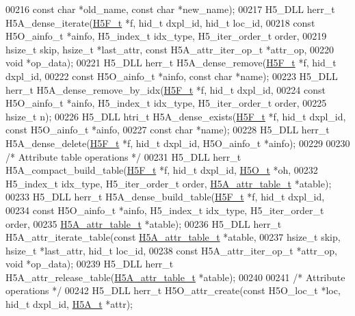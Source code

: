 \begin{DoxyCode}
00216     \textcolor{keyword}{const} \textcolor{keywordtype}{char} *old\_name, \textcolor{keyword}{const} \textcolor{keywordtype}{char} *new\_name);
00217 H5\_DLL herr\_t H5A\_dense\_iterate(\hyperlink{struct_h5_f__t}{H5F\_t} *f, hid\_t dxpl\_id, hid\_t loc\_id,
00218     \textcolor{keyword}{const} H5O\_ainfo\_t *ainfo, H5\_index\_t idx\_type, H5\_iter\_order\_t order,
00219     hsize\_t skip, hsize\_t *last\_attr, \textcolor{keyword}{const} H5A\_attr\_iter\_op\_t *attr\_op,
00220     \textcolor{keywordtype}{void} *op\_data);
00221 H5\_DLL herr\_t H5A\_dense\_remove(\hyperlink{struct_h5_f__t}{H5F\_t} *f, hid\_t dxpl\_id,
00222     \textcolor{keyword}{const} H5O\_ainfo\_t *ainfo, \textcolor{keyword}{const} \textcolor{keywordtype}{char} *name);
00223 H5\_DLL herr\_t H5A\_dense\_remove\_by\_idx(\hyperlink{struct_h5_f__t}{H5F\_t} *f, hid\_t dxpl\_id,
00224     \textcolor{keyword}{const} H5O\_ainfo\_t *ainfo, H5\_index\_t idx\_type, H5\_iter\_order\_t order,
00225     hsize\_t n);
00226 H5\_DLL htri\_t H5A\_dense\_exists(\hyperlink{struct_h5_f__t}{H5F\_t} *f, hid\_t dxpl\_id, \textcolor{keyword}{const} H5O\_ainfo\_t *ainfo,
00227     \textcolor{keyword}{const} \textcolor{keywordtype}{char} *name);
00228 H5\_DLL herr\_t H5A\_dense\_delete(\hyperlink{struct_h5_f__t}{H5F\_t} *f, hid\_t dxpl\_id, H5O\_ainfo\_t *ainfo);
00229 
00230 \textcolor{comment}{/* Attribute table operations */}
00231 H5\_DLL herr\_t H5A\_compact\_build\_table(\hyperlink{struct_h5_f__t}{H5F\_t} *f, hid\_t dxpl\_id, \hyperlink{struct_h5_o__t}{H5O\_t} *oh,
00232     H5\_index\_t idx\_type, H5\_iter\_order\_t order, \hyperlink{struct_h5_a__attr__table__t}{H5A\_attr\_table\_t} *atable);
00233 H5\_DLL herr\_t H5A\_dense\_build\_table(\hyperlink{struct_h5_f__t}{H5F\_t} *f, hid\_t dxpl\_id,
00234     \textcolor{keyword}{const} H5O\_ainfo\_t *ainfo, H5\_index\_t idx\_type, H5\_iter\_order\_t order,
00235     \hyperlink{struct_h5_a__attr__table__t}{H5A\_attr\_table\_t} *atable);
00236 H5\_DLL herr\_t H5A\_attr\_iterate\_table(\textcolor{keyword}{const} \hyperlink{struct_h5_a__attr__table__t}{H5A\_attr\_table\_t} *atable,
00237     hsize\_t skip, hsize\_t *last\_attr, hid\_t loc\_id,
00238     \textcolor{keyword}{const} H5A\_attr\_iter\_op\_t *attr\_op, \textcolor{keywordtype}{void} *op\_data);
00239 H5\_DLL herr\_t H5A\_attr\_release\_table(\hyperlink{struct_h5_a__attr__table__t}{H5A\_attr\_table\_t} *atable);
00240 
00241 \textcolor{comment}{/* Attribute operations */}
00242 H5\_DLL herr\_t H5O\_attr\_create(\textcolor{keyword}{const} H5O\_loc\_t *loc, hid\_t dxpl\_id, \hyperlink{struct_h5_a__t}{H5A\_t} *attr);

\end{DoxyCode}
